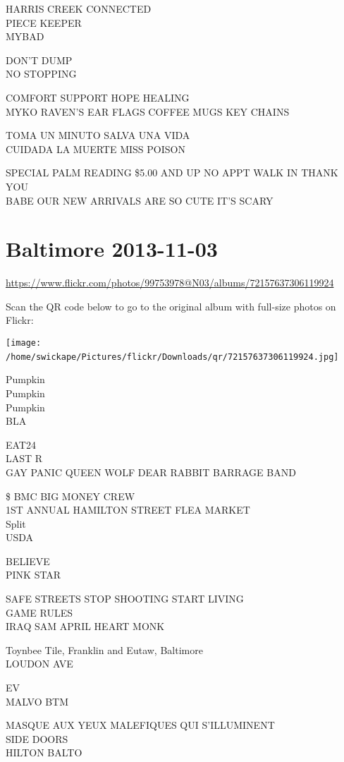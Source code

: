 \documentclass[10pt,letterpaper]{article}
\begin{document}
HARRIS CREEK CONNECTED\\
PIECE KEEPER\\
MYBAD

DON'T DUMP\\
NO STOPPING

COMFORT SUPPORT HOPE HEALING\\
MYKO RAVEN'S EAR FLAGS COFFEE MUGS KEY CHAINS

TOMA UN MINUTO SALVA UNA VIDA\\
CUIDADA LA MUERTE MISS POISON

SPECIAL PALM READING \$5.00 AND UP NO APPT WALK IN THANK YOU\\
BABE OUR NEW ARRIVALS ARE SO CUTE IT'S SCARY
\

\section*{Baltimore 2013-11-03}

\url{https://www.flickr.com/photos/99753978@N03/albums/72157637306119924}

Scan the QR code below to go to the original album with full-size photos on Flickr:

\texttt{[image: /home/swickape/Pictures/flickr/Downloads/qr/72157637306119924.jpg]}
\

Pumpkin\\
Pumpkin\\
Pumpkin\\
BLA

EAT24\\
LAST R\\
GAY PANIC QUEEN WOLF DEAR RABBIT BARRAGE BAND

\$ BMC BIG MONEY CREW\\
1ST ANNUAL HAMILTON STREET FLEA MARKET\\
Split\\
USDA

BELIEVE\\
PINK STAR

SAFE STREETS STOP SHOOTING START LIVING\\
GAME RULES\\
IRAQ SAM APRIL HEART MONK

Toynbee Tile, Franklin and Eutaw, Baltimore\\
LOUDON AVE

EV\\
MALVO BTM

MASQUE AUX YEUX MALEFIQUES QUI S'ILLUMINENT\\
SIDE DOORS\\
HILTON BALTO
\end{document}
